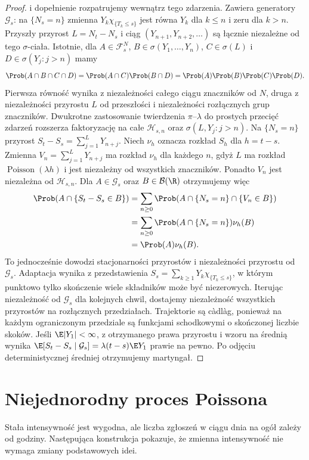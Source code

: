 \begin{proof}
i dopełnienie rozpatrujemy wewnątrz tego zdarzenia.
Zawiera generatory $\mathcal G_s$: na $\{N_s=n\}$
zmienna $Y_k\chi_{\{T_k\le s\}}$ jest równa $Y_k$ dla
$k\le n$ i zeru dla $k>n$.
Przyszły przyrost $L=N_t-N_s$ i ciąg
$(Y_{n+1},Y_{n+2},\ldots)$ są łącznie niezależne od
tego $\sigma$-ciała. Istotnie, dla
$A\in\mathcal F_s^N$, $B\in\sigma(Y_1,\ldots,Y_n)$,
$C\in\sigma(L)$ i $D\in\sigma(Y_j:j>n)$ mamy
\[
\Prob(A\cap B\cap C\cap D)
=\Prob(A\cap C)\Prob(B\cap D)
=\Prob(A)\Prob(B)\Prob(C)\Prob(D).
\]
Pierwsza równość wynika z niezależności całego ciągu
znaczników od $N$, druga z niezależności przyrostu $L$
od przeszłości i niezależności rozłącznych grup znaczników.
Dwukrotne zastosowanie twierdzenia $\pi$--$\lambda$
do prostych przecięć zdarzeń rozszerza faktoryzację
na całe $\mathcal H_{s,n}$ oraz
$\sigma(L,Y_j:j>n)$. Na $\{N_s=n\}$ przyrost
$S_t-S_s=\sum_{j=1}^{L}Y_{n+j}$.
Niech $\nu_h$ oznacza rozkład $S_h$ dla $h=t-s$.
Zmienna $V_n=\sum_{j=1}^{L}Y_{n+j}$ ma rozkład $\nu_h$
dla każdego $n$, gdyż $L$ ma rozkład
$\operatorname{Poisson}(\lambda h)$ i jest niezależny
od wszystkich znaczników. Ponadto $V_n$ jest niezależna
od $\mathcal H_{s,n}$. Dla $A\in\mathcal G_s$ oraz
$B\in\mathcal B(\R)$ otrzymujemy więc
\[
\begin{aligned}
\Prob(A\cap\{S_t-S_s\in B\})
&=\sum_{n\ge0}\Prob(A\cap\{N_s=n\}\cap\{V_n\in B\})\\
&=\sum_{n\ge0}\Prob(A\cap\{N_s=n\})\nu_h(B)\\
&=\Prob(A)\nu_h(B).
\end{aligned}
\]
To jednocześnie dowodzi stacjonarności przyrostów
i niezależności przyrostu od $\mathcal G_s$.
Adaptacja wynika z przedstawienia
$S_s=\sum_{k\ge1}Y_k\chi_{\{T_k\le s\}}$,
w którym punktowo tylko skończenie wiele składników
może być niezerowych. Iterując niezależność od
$\mathcal G_s$ dla kolejnych chwil, dostajemy
niezależność wszystkich przyrostów na rozłącznych
przedziałach. Trajektorie są c\`adl\`ag, ponieważ
na każdym ograniczonym przedziale są funkcjami
schodkowymi o skończonej liczbie skoków.
Jeśli $\E|Y_1|<\infty$, z otrzymanego prawa przyrostu
i wzoru na średnią wynika
$\E[S_t-S_s\mid\mathcal G_s]=\lambda(t-s)\E Y_1$
prawie na pewno. Po odjęciu deterministycznej średniej
otrzymujemy martyngał.
\end{proof}

\section{Niejednorodny proces Poissona}
Stała intensywność jest wygodna, ale liczba zgłoszeń w ciągu
dnia na ogół zależy od godziny. Następująca konstrukcja pokazuje,
że zmienna intensywność nie wymaga zmiany podstawowych idei.

